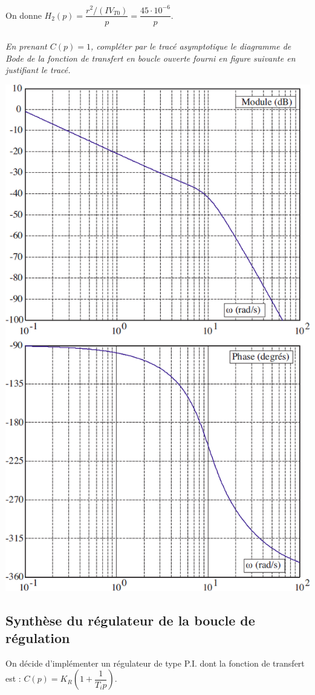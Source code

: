 \documentclass[10pt,fleqn]{article} %
\begin{document}
\begin{multicols}{2}
On donne $H_2(p)=\dfrac{r^2/\left( IV_{T0}\right)}{p} = \dfrac{45\cdot 10^{-6}}{p}$.

\subparagraph{}
\textit{En prenant $C(p)=1$, compléter par le tracé asymptotique le diagramme
de Bode de la fonction de transfert en boucle ouverte fourni en figure suivante
en justifiant le tracé.}

\begin{center}
\includegraphics[width=\linewidth]{images/fig_03}
\end{center}

\subsection*{Synthèse du régulateur de la boucle de régulation}
On décide d’implémenter un régulateur de type P.I. dont la fonction de transfert
est : $C(p)=K_R\left( 1+\dfrac{1}{T_i p}\right)$.



\end{multicols}
\end{document}
